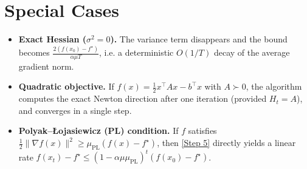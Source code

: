 \documentclass[11pt]{article}
\begin{document}
\section*{Special Cases}
\begin{itemize}
\item \textbf{Exact Hessian ($\sigma^{2}=0$).}  
The variance term disappears and the bound becomes
$\frac{2(f(x_{0})-f^{\star})}{\alpha\mu T}$, i.e. a deterministic
$O(1/T)$ decay of the average gradient norm.
\item \textbf{Quadratic objective.}  
If $f(x)=\frac12 x^{\top}Ax-b^{\top}x$ with $A\succ 0$, the algorithm computes the
exact Newton direction after one iteration (provided $H_{t}=A$), and
converges in a single step.
\item \textbf{Polyak–Łojasiewicz (PL) condition.}  
If $f$ satisfies $\frac12\|\nabla f(x)\|^{2}\ge \mu_{\text{PL}}(f(x)-f^{\star})$,
then \eqref{Step 5} directly yields a linear rate
$f(x_{t})-f^{\star}\le (1-\alpha\mu\mu_{\text{PL}})^{t}(f(x_{0})-f^{\star})$.
\end{itemize}
\end{document}
